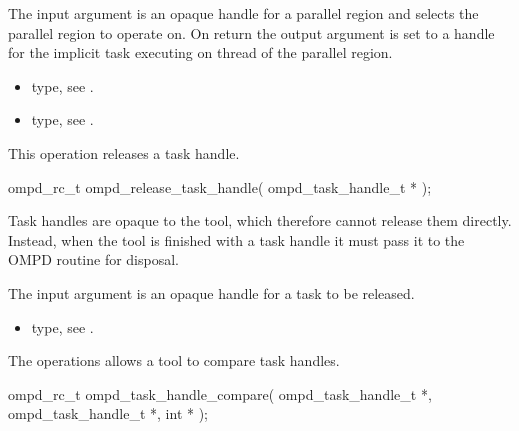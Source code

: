 \argdesc
The input argument  is an opaque handle for a parallel region and selects the parallel region to operate on.
On return the output argument  is set to a handle for the implicit task
executing on  thread of the parallel region.

\crossreferences
\begin{itemize}
	\item {} type, see .
	\item {} type, see .
\end{itemize}

\label{subsubsubsec:ompd_release_task_handle}
\summary
This operation releases a task handle.

\format

\begin{cspecific}
\begin{ompSyntax}
ompd_rc_t ompd_release_task_handle(
  ompd_task_handle_t *
);
\end{ompSyntax}
\end{cspecific}


\descr
Task handles are opaque to the tool, which therefore cannot release
them directly. Instead, when the tool is finished with a task handle it must
pass it to the OMPD  routine
for disposal.

\argdesc
The input argument  is an opaque handle for a task
to be released.

\crossreferences
\begin{itemize}
	\item {} type, see .
\end{itemize}


\label{subsubsubsec:ompd_task_handle_compare}
\summary
The  operations allows a tool to compare task 
handles.

\format

\begin{cspecific}
\begin{ompSyntax}
ompd_rc_t ompd_task_handle_compare(
  ompd_task_handle_t *,
  ompd_task_handle_t *,
  int *
);
\end{ompSyntax}
\end{cspecific}


